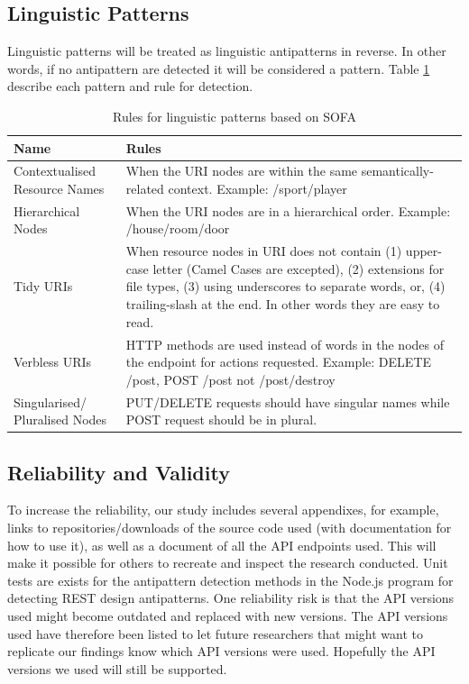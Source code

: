 \documentclass[a4paper,12pt]{article}
\begin{document}
\clearpage

\subsection{Linguistic Patterns}

Linguistic patterns will be treated as linguistic antipatterns in reverse. In other words, if no antipattern are detected it will be considered a pattern. Table \ref{tab:Rules for linguistic patterns} describe each pattern and rule for detection.

\begin{center}
\begin{table}[!ht]
\begin{tabular}{|p{30mm}|p{105mm}|}
\hline \textbf{Name} & \textbf{Rules} \\
\hline 
Contextualised Resource Names &
When the URI nodes are within the same semantically-related context. Example: /sport/player
\\ \hline
Hierarchical Nodes &
When the URI nodes are in a hierarchical order. Example: /house/room/door
\\ \hline
Tidy URIs &
When resource nodes in URI does not contain (1) upper-case letter (Camel Cases are excepted), (2)  extensions for file types, (3) using underscores to separate words, or, (4) trailing-slash at the end. In other words they are easy to read.
\\ \hline
Verbless URIs &
HTTP methods are used instead of words in the nodes of the endpoint for actions requested. Example: DELETE /post, POST /post not /post/destroy
\\ \hline
Singularised/ Pluralised Nodes &
PUT/DELETE requests should have singular names while POST request should be in plural.
\\ \hline
\end{tabular}
    \caption{Rules for linguistic patterns based on SOFA \cite{sofaanti}}
    \label{tab:Rules for linguistic patterns}
\end{table}
\end{center}

\subsection{Reliability and Validity}

To increase the reliability, our study includes several appendixes, for example, links to repositories/downloads of the source code used (with documentation for how to use it), as well as a document of all the API endpoints used. This will make it possible for others to recreate and inspect the research conducted. Unit tests are exists for the antipattern detection methods in the Node.js program for detecting REST design antipatterns. 
One reliability risk is that the API versions used might become outdated and replaced with new versions. The API versions used have therefore been listed to let future researchers that might want to replicate our findings know which API versions were used. Hopefully the API versions we used will still be supported.
\end{document}
